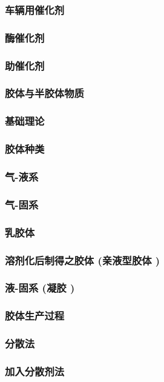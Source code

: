 \documentclass[UTF8]{../../ApplicationUniverse}
\begin{document}
        \subsubsection{车辆用催化剂}
        \subsubsection{酶催化剂}
        \subsubsection{助催化剂}
\subsubsection{胶体与半胶体物质}
    \subsubsection{基础理论}
    \subsubsection{胶体种类}
        \subsubsection{气-液系}
        \subsubsection{气-固系}
        \subsubsection{乳胶体}
        \subsubsection{溶剂化后制得之胶体 (亲液型胶体 )}
        \subsubsection{液-固系 (凝胶 )}
    \subsubsection{胶体生产过程}
        \subsubsection{分散法}
            \subsubsection{加入分散剂法}
\end{document}
